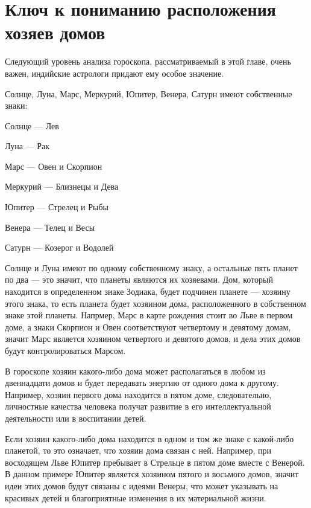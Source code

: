 \section{Ключ к пониманию расположения хозяев домов}

Следующий уровень анализа гороскопа, рассматриваемый в этой главе, очень важен, индийские астрологи придают ему особое значение.

Солнце, Луна, Марс, Меркурий, Юпитер, Венера, Сатурн имеют собственные знаки:

\begin{mylist}
	\item Солнце --- Лев
	\item Луна --- Рак
	\item Марс --- Овен и Скорпион
	\item Меркурий --- Близнецы и Дева
	\item Юпитер --- Стрелец и Рыбы
	\item Венера --- Телец и Весы
	\item Сатурн --- Козерог и Водолей
\end{mylist}

Солнце и Луна имеют по одному собственному знаку, а остальные пять планет по два --- это значит, что планеты являются их хозяевами. Дом, который находится в определенном знаке Зодиака, будет подчинен планете --- хозяину этого знака, то есть планета будет хозяином дома, расположенного в собственном знаке этой планеты. Напрмер, Марс в карте рождения стоит во Льве в первом доме, а знаки Скорпион и Овен соответствуют четвертому и девятому домам, значит Марс является хозяином четвертого и девятого домов, и дела этих домов будут контролироваться Марсом.

В гороскопе хозяин какого-либо дома может располагаться в любом из двеннадцати домов и будет передавать энергию от одного дома к другому. Например, хозяин первого дома находится в пятом доме, следовательно, личностные качества человека получат развитие в его интеллектуальной деятельности или в воспитании детей.

Если хозяин какого-либо дома находится в одном и том же знаке с какой-либо планетой, то это означает, что хозяин дома связан с ней. Например, при восходящем Льве Юпитер пребывает в Стрельце в пятом доме вместе с Венерой. В данном примере Юпитер является хозяином пятого и восьмого домов, значит идеи этих домов будут связаны с идеями Венеры, что может указывать на красивых детей и благоприятные изменения в их материальной жизни.

